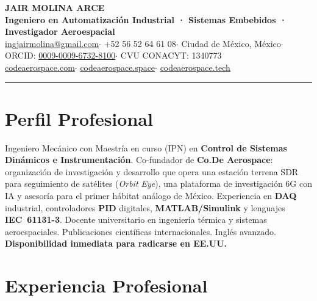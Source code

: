 \documentclass[10pt, letterpaper]{article}
\begin{document}
\pagestyle{empty}

\begin{center}
  {\LARGE\bfseries\color{azuloscuro} JAIR MOLINA ARCE}\\[3pt]
  {\small\color{azulmedio}\textbf{Ingeniero en Automatización Industrial · Sistemas Embebidos · Investigador Aeroespacial}}\\[4pt]
  {\footnotesize\color{gristexto}
    \href{mailto:ingjairmolina@gmail.com}{ingjairmolina@gmail.com}\enspace$\cdot$\enspace
    +52 56 52 64 61 08\enspace$\cdot$\enspace
    Ciudad de México, México\enspace$\cdot$\enspace
    ORCID: \href{https://orcid.org/0009-0009-6732-8100}{0009-0009-6732-8100}\enspace$\cdot$\enspace
    CVU CONACYT: 1340773
  }\\[1pt]
  {\footnotesize\color{azulmedio}
    \href{https://codeaerospace.com}{codeaerospace.com}\enspace$\cdot$\enspace
    \href{https://codeaerospace.space}{codeaerospace.space}\enspace$\cdot$\enspace
    \href{https://codeaerospace.tech}{codeaerospace.tech}
  }
\end{center}

\vspace{-2pt}
{\color{lineagris}\rule{\linewidth}{0.5pt}}
\vspace{2pt}

\section{Perfil Profesional}

{\small\color{gristexto}
Ingeniero Mecánico con Maestría en curso (IPN) en \textbf{Control de Sistemas Dinámicos e Instrumentación}. Co-fundador de \textbf{Co.De Aerospace}: organización de investigación y desarrollo que opera una estación terrena SDR para seguimiento de satélites (\textit{Orbit Eye}), una plataforma de investigación 6G con IA y asesoría para el primer hábitat análogo de México. Experiencia en \textbf{DAQ} industrial, controladores \textbf{PID} digitales, \textbf{MATLAB/Simulink} y lenguajes \textbf{IEC~61131-3}. Docente universitario en ingeniería térmica y sistemas aeroespaciales. Publicaciones científicas internacionales. Inglés avanzado. \textbf{Disponibilidad inmediata para radicarse en EE.UU.}
}

\section{Experiencia Profesional}
\end{document}
